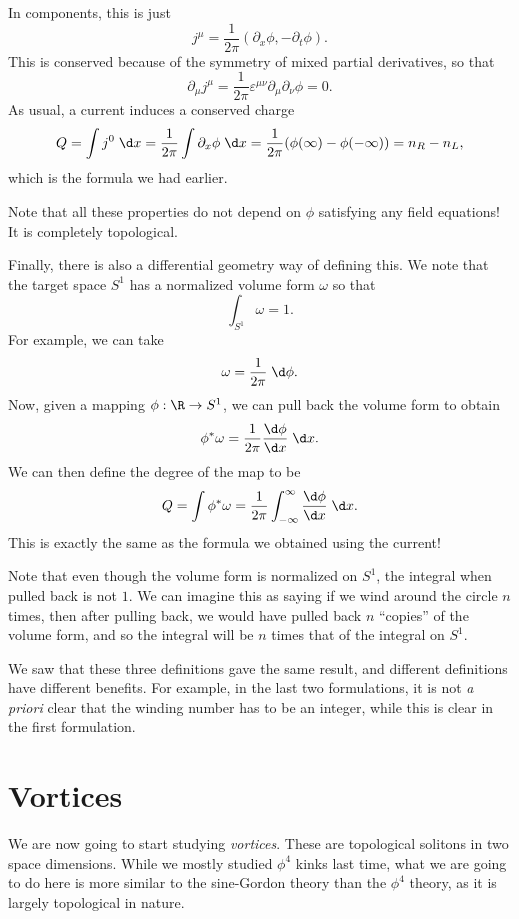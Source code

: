 \documentclass[a4paper]{article}
\begin{document}
In components, this is just
\[
  j^\mu = \frac{1}{2\pi} (\partial_x \phi, - \partial_t \phi).
\]
This is conserved because of the symmetry of mixed partial derivatives, so that
\[
  \partial_\mu j^\mu = \frac{1}{2\pi} \varepsilon^{\mu\nu} \partial_\mu \partial_\nu \phi = 0.
\]
As usual, a current induces a conserved charge
\[
  Q = \int j^0 \;\d x = \frac{1}{2\pi} \int \partial_x \phi \;\d x = \frac{1}{2\pi} (\phi(\infty) - \phi(-\infty)) = n_R - n_L,
\]
which is the formula we had earlier.

Note that all these properties do not depend on $\phi$ satisfying any field equations! It is completely topological.

\separator

Finally, there is also a differential geometry way of defining this. We note that the target space $S^1$ has a normalized volume form $\omega$ so that
\[
  \int_{S^1} \omega = 1.
\]
For example, we can take
\[
  \omega = \frac{1}{2\pi}\;\d \phi.
\]
Now, given a mapping $\phi: \R \to S^1$, we can pull back the volume form to obtain
\[
  \phi^* \omega = \frac{1}{2\pi} \frac{\d \phi}{\d x} \;\d x.
\]
We can then define the degree of the map to be
\[
  Q = \int \phi^* \omega = \frac{1}{2\pi}\int_{-\infty}^\infty \frac{\d \phi}{\d x}\;\d x.
\]
This is exactly the same as the formula we obtained using the current!

Note that even though the volume form is normalized on $S^1$, the integral when pulled back is not $1$. We can imagine this as saying if we wind around the circle $n$ times, then after pulling back, we would have pulled back $n$ ``copies'' of the volume form, and so the integral will be $n$ times that of the integral on $S^1$.

\separator

We saw that these three definitions gave the same result, and different definitions have different benefits. For example, in the last two formulations, it is not \emph{a priori} clear that the winding number has to be an integer, while this is clear in the first formulation.

\section{Vortices}
We are now going to start studying \emph{vortices}. These are topological solitons in two space dimensions. While we mostly studied $\phi^4$ kinks last time, what we are going to do here is more similar to the sine-Gordon theory than the $\phi^4$ theory, as it is largely topological in nature.
\end{document}
